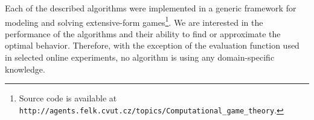 Each of the described algorithms were implemented in a generic framework for modeling and solving extensive-form games\footnote{Source code is available at \texttt{http://agents.felk.cvut.cz/topics/Computational\_\newline game\_theory}.}.
We are interested in the performance of the algorithms and their ability to find or approximate the optimal behavior.
Therefore, with the exception of the evaluation function used in selected online experiments, no algorithm is using any domain-specific knowledge.



